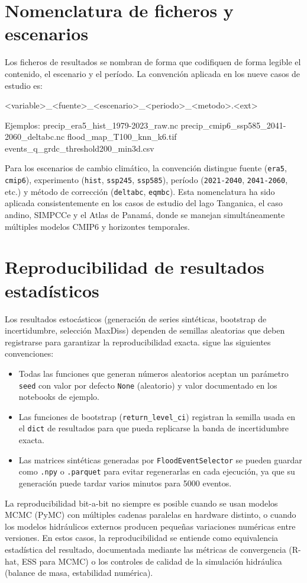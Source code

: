 \section{Nomenclatura de ficheros y escenarios}

Los ficheros de resultados se nombran de forma que codifiquen de forma legible el contenido, el escenario y el período. La convención aplicada en los nueve casos de estudio es:

\begin{codeblock}
<variable>_<fuente>_<escenario>_<periodo>_<metodo>.<ext>

Ejemplos:
  precip_era5_hist_1979-2023_raw.nc
  precip_cmip6_ssp585_2041-2060_deltabc.nc
  flood_map_T100_knn_k6.tif
  events_q_grdc_threshold200_min3d.csv
\end{codeblock}

Para los escenarios de cambio climático, la convención distingue fuente (\texttt{era5}, \texttt{cmip6}), experimento (\texttt{hist}, \texttt{ssp245}, \texttt{ssp585}), período (\texttt{2021-2040}, \texttt{2041-2060}, etc.) y método de corrección (\texttt{deltabc}, \texttt{eqmbc}). Esta nomenclatura ha sido aplicada consistentemente en los casos de estudio del lago Tanganica, el caso andino, SIMPCCe y el Atlas de Panamá, donde se manejan simultáneamente múltiples modelos CMIP6 y horizontes temporales.

\section{Reproducibilidad de resultados estadísticos}

Los resultados estocásticos (generación de series sintéticas, bootstrap de incertidumbre, selección MaxDiss) dependen de semillas aleatorias que deben registrarse para garantizar la reproducibilidad exacta. \pyhydra sigue las siguientes convenciones:

\begin{itemize}
  \item Todas las funciones que generan números aleatorios aceptan un parámetro \texttt{seed} con valor por defecto \texttt{None} (aleatorio) y valor documentado en los notebooks de ejemplo.
  \item Las funciones de bootstrap (\texttt{return\_level\_ci}) registran la semilla usada en el \texttt{dict} de resultados para que pueda replicarse la banda de incertidumbre exacta.
  \item Las matrices sintéticas generadas por \texttt{FloodEventSelector} se pueden guardar como \texttt{.npy} o \texttt{.parquet} para evitar regenerarlas en cada ejecución, ya que su generación puede tardar varios minutos para 5000 eventos.
\end{itemize}

La reproducibilidad bit-a-bit no siempre es posible cuando se usan modelos MCMC (PyMC) con múltiples cadenas paralelas en hardware distinto, o cuando los modelos hidráulicos externos producen pequeñas variaciones numéricas entre versiones. En estos casos, la reproducibilidad se entiende como equivalencia estadística del resultado, documentada mediante las métricas de convergencia (R-hat, ESS para MCMC) o los controles de calidad de la simulación hidráulica (balance de masa, estabilidad numérica).
